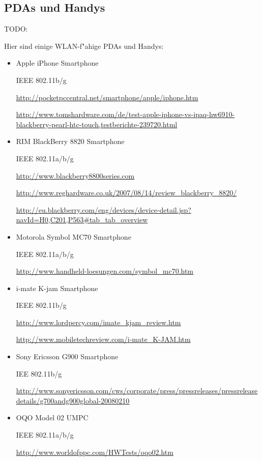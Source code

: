 \subsection{PDAs und Handys}

TODO: 

Hier sind einige WLAN-f"ahige PDAs und Handys:
\begin{itemize}	

\item Apple iPhone Smartphone

IEEE 802.11b/g

\url{http://pocketpccentral.net/smartphone/apple/iphone.htm}

\url{http://www.tomshardware.com/de/test-apple-iphone-vs-ipaq-hw6910-blackberry-pearl-htc-touch,testberichte-239720.html}

\item RIM BlackBerry 8820 Smartphone

IEEE 802.11a/b/g

\url{http://www.blackberry8800series.com}

\url{http://www.reghardware.co.uk/2007/08/14/review\_blackberry\_8820/}

\url{http://eu.blackberry.com/eng/devices/device-detail.jsp?navId=H0,C201,P563#tab\_tab\_overview}

\item Motorola Symbol MC70 Smartphone

IEEE 802.11a/b/g

\url{http://www.handheld-loesungen.com/symbol\_mc70.htm}

\item i-mate K-jam Smartphone

IEEE 802.11b/g

\url{http://www.lordpercy.com/imate\_kjam\_review.htm}

\url{http://www.mobiletechreview.com/i-mate\_K-JAM.htm}

\item Sony Ericsson G900 Smartphone

IEE 802.11b/g

\url{http://www.sonyericsson.com/cws/corporate/press/pressreleases/pressreleasedetails/g700andg900global-20080210}

\item OQO Model 02 UMPC

IEEE 802.11a/b/g

\url{http://www.worldofppc.com/HWTests/oqo02.htm}

\end{itemize}

